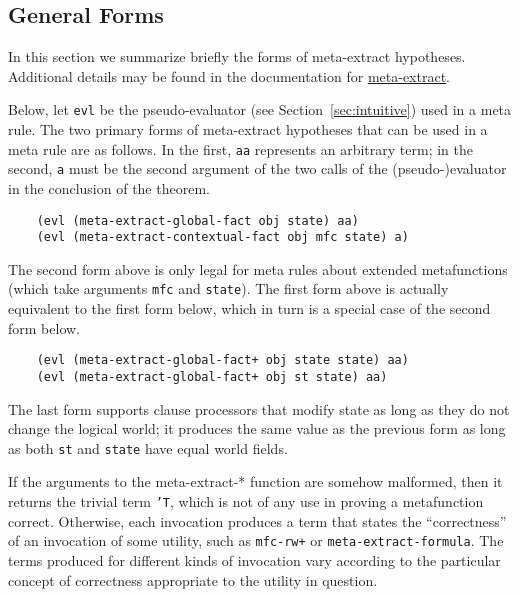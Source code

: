 \subsection{General Forms}
\label{sec:general}

In this section we summarize briefly the forms of meta-extract
hypotheses.  Additional details may be found in the documentation for
\href{http://www.cs.utexas.edu/users/moore/acl2/manuals/current/manual/index.html?topic=ACL2\_\_\_\_META-EXTRACT}{\underline{meta-extract}}.

Below, let {\tt evl} be the pseudo-evaluator (see
Section~\ref{sec:intuitive}) used in a meta rule.  The two primary
forms of meta-extract hypotheses that can be used in a meta rule are
as follows.  In the first, {\tt aa} represents an arbitrary term; in
the second, {\tt a} must be the second argument of the two calls of
the (pseudo-)evaluator in the conclusion of the theorem.

\begin{verbatim}
    (evl (meta-extract-global-fact obj state) aa)
    (evl (meta-extract-contextual-fact obj mfc state) a)
\end{verbatim}

The second form above is only legal for meta rules about extended
metafunctions (which take arguments {\tt mfc} and {\tt state}).  The
first form above is actually equivalent to the first form below, which
in turn is a special case of the second form below.

\begin{verbatim}
    (evl (meta-extract-global-fact+ obj state state) aa)
    (evl (meta-extract-global-fact+ obj st state) aa)
\end{verbatim}

The last form supports clause processors that modify state as long as
they do not change the logical world; it produces the same value as
the previous form as long as both {\tt st} and {\tt state} have equal
world fields.

If the arguments to the meta-extract-* function are somehow malformed,
then it returns the trivial term {\tt 'T}, which is not of any use in
proving a metafunction correct.  Otherwise, each invocation produces a
term that states the ``correctness'' of an invocation of some
utility, such as {\tt mfc-rw+} or {\tt meta-\allowbreak{}extract-\allowbreak{}formula}.  The
terms produced for different kinds of invocation vary according to the
particular concept of correctness appropriate to the utility in
question.


